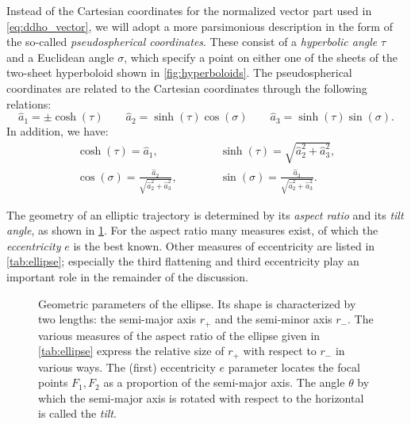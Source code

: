 Instead of the Cartesian coordinates for the normalized vector part used in \cref{eq:ddho_vector}, we will adopt a more parsimonious description in the form of the so-called \emph{pseudospherical coordinates}. These consist of a \emph{hyperbolic angle} \(\tau\)  and a Euclidean angle \(\sigma\), which specify a point on either one of the sheets of the two-sheet hyperboloid shown in \cref{fig:hyperboloids}. The pseudospherical coordinates are related to the Cartesian coordinates through the following relations:
\begin{equation}
    \hat{a}_1 = \pm\cosh(\tau) \qquad \hat{a}_2 = \sinh(\tau) \cos(\sigma) \qquad \hat{a}_3 = \sinh(\tau) \sin(\sigma).
\end{equation}
In addition, we have:
\begin{equation} 
    \begin{array}{cc}
        \displaystyle \cosh(\tau) = \hat{a}_1, \quad & \quad 
        \displaystyle \sinh(\tau) = \sqrt{\hat{a}_2^2 + \hat{a}_3^2}, \\[0.5cm]
        \displaystyle \cos(\sigma) = \frac{\hat{a}_2}{\sqrt{\hat{a}_2^2 + \hat{a}_3^2}}, \qquad & \quad
        \displaystyle \sin(\sigma) = \frac{\hat{a}_3}{\sqrt{\hat{a}_2^2 + \hat{a}_3^2}}. 
    \end{array}
    \label{eq:hyperb_coordinate_relations}
\end{equation}

The geometry of an elliptic trajectory is determined by its \emph{aspect ratio} and its \emph{tilt angle}, as shown in \cref{fig:ellipse}. For the aspect ratio many measures exist, of which the \emph{eccentricity} \(e\) is the best known. Other measures of eccentricity are listed in \cref{tab:ellipse}; especially the third flattening and third eccentricity play an important role in the remainder of the discussion.

\begin{figure}[ht]
    \centering
    
    \caption{Geometric parameters of the ellipse. Its shape is characterized by two lengths: the semi-major axis \(r_+\) and the semi-minor axis \(r_-\). The various measures of the aspect ratio of the ellipse given in \cref{tab:ellipse} express the relative size of \(r_+\) with respect to \(r_-\) in various ways. The (first) eccentricity \(e\) parameter locates the focal points \(F_1, F_2\) as a proportion of the semi-major axis. The angle \(\theta\) by which the semi-major axis is rotated with respect to the horizontal is called the \emph{tilt}.}
    \label{fig:ellipse}
\end{figure}

